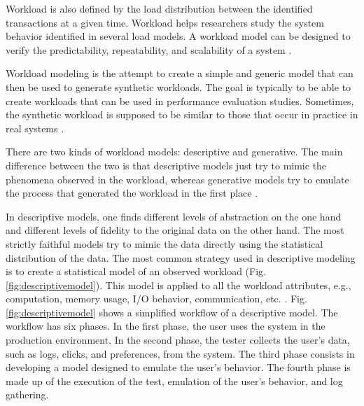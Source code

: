 Workload is also defined by the load distribution between the identified transactions at a given time. Workload helps researchers study the system behavior identified in several load models. A workload model can be designed to verify the predictability, repeatability, and scalability of a system \cite{Feitelson2013} \cite{Molyneaux2009}.


Workload modeling is the attempt to create a simple and generic model that can then be used to generate synthetic workloads. The goal is typically to be able to create workloads that can be used in performance evaluation studies. Sometimes, the synthetic workload is supposed to be similar to those that occur in practice in real systems \cite{Feitelson2013} \cite{Molyneaux2009}.

There are two kinds of workload models: descriptive and generative. The main difference between the two is that descriptive models just try to mimic the phenomena observed in the workload, whereas generative models try to emulate the process that generated the workload in the first place \cite{DiLucca2006}. 

In descriptive models, one finds different levels of abstraction on the one hand and different levels of fidelity to the original data on the other hand. The most strictly faithful models try to mimic the data directly using the statistical distribution of the data. The most common strategy used in descriptive modeling is to create a statistical model of an observed workload (Fig. \ref{fig:descriptivemodel}). This model is applied to all the workload attributes, e.g., computation, memory usage, I/O behavior, communication, etc. \cite{DiLucca2006}. Fig. \ref{fig:descriptivemodel} shows a simplified workflow of a descriptive model. The workflow has six phases. In the first phase, the user uses the system in the production environment. In the second phase, the tester collects the user's data, such as logs, clicks, and preferences, from the system. The third phase consists in developing a model designed to emulate the user's behavior. The fourth phase is made up of the execution of the test, emulation of the user's behavior, and log gathering.



